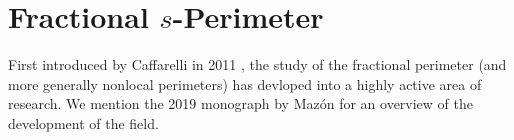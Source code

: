 \documentclass[../main.tex]{subfiles}
\begin{document}
\section{Fractional $s$-Perimeter}\label{sec:sperim}
First introduced by Caffarelli in 2011 \cite{caffarelli:nonlocal, caffarelli:limit}, the study of the fractional perimeter (and more generally nonlocal perimeters) has devloped into a highly active area of research. We mention the 2019 monograph by Maz\'on \cite{mazon:nonlocal} for an overview of the development of the field. 


%
%
%
%
%
\end{document}
